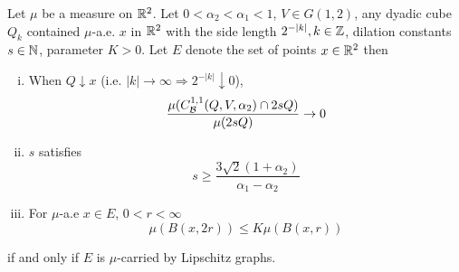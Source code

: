 \begin{lemma}\label{lemma:limQ-2sQ-0}
    Let $\mu$ be a measure on $\mathbb{R}^2$. Let $0<\alpha_2<\alpha_1<1$, $V\in G(1,2)$, any dyadic cube $Q_k$ contained $\mu$-a.e. $x$ in $\mathbb{R}^2$ with the side length $2^{-|k|}, k\in\mathbb{Z}$, dilation constants $s\in\mathbb{N}$, parameter $K>0$. Let $E$ denote the set of points $x\in\mathbb{R}^2$ then
    \begin{enumerate}[(i)]
        \item \label{lemmq-1:limQ-2sQ-0} When $Q\downarrow x$ (i.e. $|k|\rightarrow\infty \Rightarrow 2^{-|k|}\downarrow 0$),
        \begin{equation}\label{eq:limBC-2sQ-0}
            \frac{\mu(C_\mathcal B^{1,1}(Q, V, \alpha_2)\cap 2sQ)}{\mu(2sQ)} \rightarrow 0
        \end{equation}
        \item \label{lemmq-2:limQ-2sQ-0} $s$ satisfies
        \begin{equation}  
            s \geq \frac{3\sqrt{2}(1+\alpha_2)}{\alpha_1-\alpha_2}
        \end{equation}
        \item \label{lemmq-3:limQ-2sQ-0} For $\mu$-a.e $x\in E$, $0<r<\infty$
        \begin{equation}
            \mu(B(x, 2r))\leq K\mu(B(x,r))
        \end{equation}
    \end{enumerate}
    if and only if $E$ is $\mu$-carried by Lipschitz graphs.
\end{lemma}
